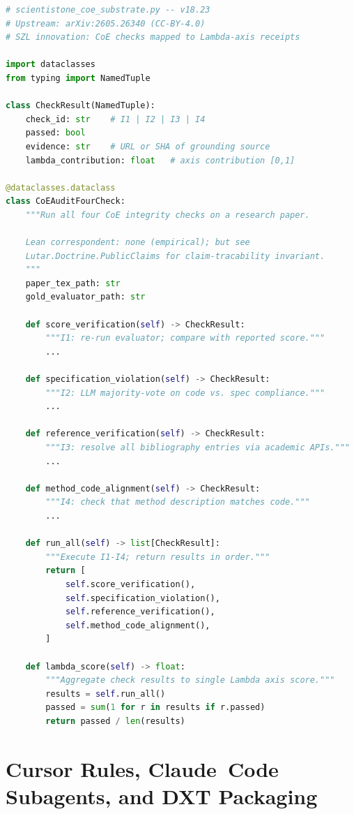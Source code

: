 \begin{lstlisting}[language=Python, caption={\texttt{CoEAuditFourCheck}
  implementation sketch}, label={lst:coe-check}]
# scientistone_coe_substrate.py -- v18.23
# Upstream: arXiv:2605.26340 (CC-BY-4.0)
# SZL innovation: CoE checks mapped to Lambda-axis receipts

import dataclasses
from typing import NamedTuple

class CheckResult(NamedTuple):
    check_id: str    # I1 | I2 | I3 | I4
    passed: bool
    evidence: str    # URL or SHA of grounding source
    lambda_contribution: float   # axis contribution [0,1]

@dataclasses.dataclass
class CoEAuditFourCheck:
    """Run all four CoE integrity checks on a research paper.
    
    Lean correspondent: none (empirical); but see
    Lutar.Doctrine.PublicClaims for claim-tracability invariant.
    """
    paper_tex_path: str
    gold_evaluator_path: str
    
    def score_verification(self) -> CheckResult:
        """I1: re-run evaluator; compare with reported score."""
        ...
    
    def specification_violation(self) -> CheckResult:
        """I2: LLM majority-vote on code vs. spec compliance."""
        ...
    
    def reference_verification(self) -> CheckResult:
        """I3: resolve all bibliography entries via academic APIs."""
        ...
    
    def method_code_alignment(self) -> CheckResult:
        """I4: check that method description matches code."""
        ...
    
    def run_all(self) -> list[CheckResult]:
        """Execute I1-I4; return results in order."""
        return [
            self.score_verification(),
            self.specification_violation(),
            self.reference_verification(),
            self.method_code_alignment(),
        ]
    
    def lambda_score(self) -> float:
        """Aggregate check results to single Lambda axis score."""
        results = self.run_all()
        passed = sum(1 for r in results if r.passed)
        return passed / len(results)
\end{lstlisting}

\section{Cursor Rules, Claude~Code Subagents, and DXT Packaging}
\label{sec:cursor-rules}

